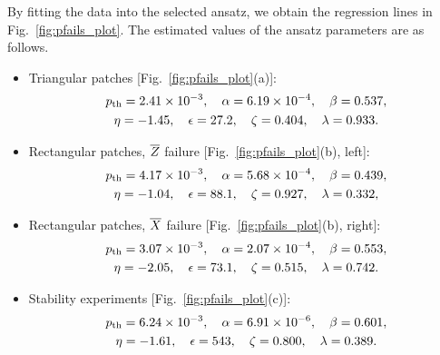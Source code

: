 \documentclass[
 prx,
 reprint,
 superscriptaddress,
 longbibliography,
 dvipsnames
]{revtex4-2}
\begin{document}
By fitting the data into the selected ansatz, we obtain the regression lines in Fig.~\ref{fig:pfails_plot}.
The estimated values of the ansatz parameters are as follows.

\begin{itemize}
    \item Triangular patches [Fig.~\ref{fig:pfails_plot}(a)]:
    \begin{gather*}
        p_{\mathrm{th}} = 2.41 \times 10^{-3}, \quad \alpha = 6.19 \times 10^{-4}, \quad \beta = 0.537, \\
        \eta = -1.45, \quad \epsilon = 27.2, \quad \zeta = 0.404, \quad \lambda = 0.933.
    \end{gather*}
    \item Rectangular patches, $\overline{Z}$ failure [Fig.~\ref{fig:pfails_plot}(b), left]:
    \begin{gather*}
        p_{\mathrm{th}} = 4.17 \times 10^{-3}, \quad \alpha = 5.68 \times 10^{-4}, \quad \beta = 0.439, \\
        \eta = -1.04, \quad \epsilon = 88.1, \quad \zeta = 0.927, \quad \lambda = 0.332,
    \end{gather*}
    \item Rectangular patches, $\overline{X}$ failure [Fig.~\ref{fig:pfails_plot}(b), right]:
    \begin{gather*}
        p_{\mathrm{th}} = 3.07 \times 10^{-3}, \quad \alpha = 2.07 \times 10^{-4}, \quad \beta = 0.553, \\
        \eta = -2.05, \quad \epsilon = 73.1, \quad \zeta = 0.515, \quad \lambda = 0.742.
    \end{gather*}
    \item Stability experiments [Fig.~\ref{fig:pfails_plot}(c)]:
    \begin{gather*}
        p_{\mathrm{th}} = 6.24 \times 10^{-3}, \quad \alpha = 6.91 \times 10^{-6}, \quad \beta = 0.601, \\
        \eta = -1.61, \quad \epsilon = 543, \quad \zeta = 0.800, \quad \lambda = 0.389.
    \end{gather*}
\end{itemize}
\end{document}
